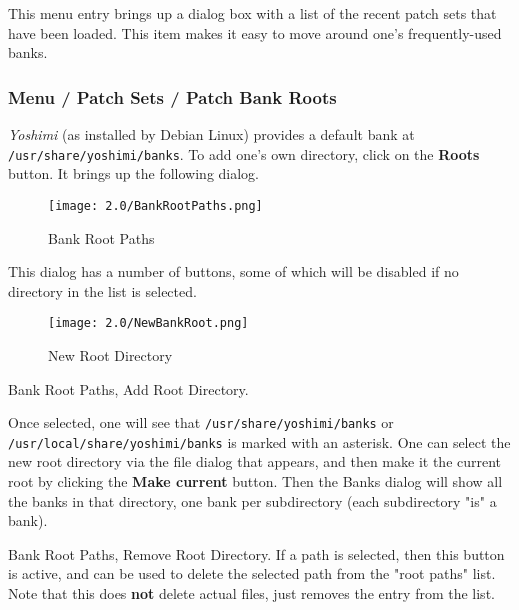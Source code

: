    This menu entry brings up a dialog box with a list of the recent patch sets
   that have been loaded.  This item makes it easy to move around one's
   frequently-used banks.

\subsubsection{Menu / Patch Sets / Patch Bank Roots}
\label{subsubsec:menu_patch_sets_patch_bank_roots}

   \textsl{Yoshimi} (as installed by Debian Linux) provides a default bank at
   \texttt{/usr/share/yoshimi/banks}.
   To add one's own directory, click on the \textbf{Roots} button.
   It brings up the following dialog.

\begin{figure}[H]
   \centering
   \texttt{[image: 2.0/BankRootPaths.png]}
   \caption{Bank Root Paths}
   \label{fig:bank_root_paths}
\end{figure}

   This dialog has a number of buttons, some of which will be disabled if no
   directory in the list is selected.


\begin{figure}[H]
   \centering
   \texttt{[image: 2.0/NewBankRoot.png]}
   \caption{New Root Directory}
   \label{fig:new_root_directory}
\end{figure}


   \setcounter{ItemCounter}{0}      %

   Bank Root Paths, Add Root Directory.

   Once selected, one will see that
   \texttt{/usr/share/yoshimi/banks} or
   \texttt{/usr/local/share/yoshimi/banks}
   is marked with an asterisk.  One can select the new root directory via the
   file dialog that appears, and then make it the current root by clicking the
   \textbf{Make current} button.  Then the Banks dialog will show all the banks
   in that directory, one bank per subdirectory (each subdirectory "is" a
   bank).

   Bank Root Paths, Remove Root Directory.
   If a path is selected, then this button is active, and can be used to
   delete the selected path from the "root paths" list. Note that this does
   \textbf{not} delete actual files, just removes the entry from the list.

